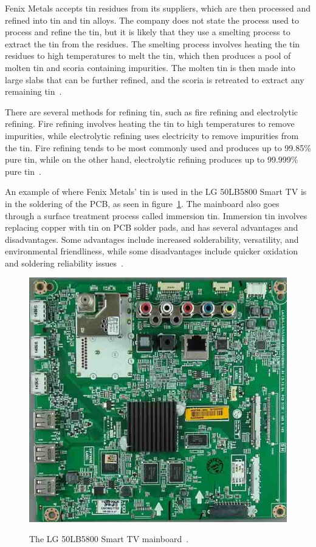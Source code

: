 \documentclass[12pt, letterpaper]{article}
\begin{document}
Fenix Metals accepts tin residues from its suppliers, which are then
processed and refined into tin and tin alloys. The company does not
state the process used to process and refine the tin, but it is likely that they
use a smelting process to extract the tin from the residues. The
smelting process involves heating the tin residues to high temperatures
to melt the tin, which then produces a pool of molten tin and scoria
containing impurities. The molten tin is then made into large slabs that can be
further refined, and the scoria is retreated to extract any remaining
tin~\autocite{barry-1999}.

There are several methods for refining tin, such as fire refining and
electrolytic refining. Fire refining involves heating the tin to high
temperatures to remove impurities, while electrolytic refining uses
electricity to remove impurities from the tin. Fire refining tends to be
most commonly used and produces up to 99.85\% pure tin, while
on the other hand, electrolytic refining produces up to 99.999\% pure
tin~\autocite{barry-1999}.

An example of where Fenix Metals' tin is used in the LG 50LB5800 Smart
TV is in the soldering of the PCB, as seen in
figure~\ref{fig:EBT62999602}. The mainboard also goes through a
surface treatment process called immersion tin. Immersion tin involves
replacing copper with tin on
PCB solder pads, and has several advantages and disadvantages. Some
advantages include increased solderability, versatility, and
environmental friendliness, while some disadvantages include quicker
oxidation and soldering reliability issues~\autocite{jenell-2023}.

\begin{figure}[H]
\medskip
\centering
\includegraphics[width=1\linewidth]{EBT62999602}
\caption{The LG 50LB5800 Smart TV mainboard~\autocite{tv-parts-canada-2024}.}
\medskip\label{fig:EBT62999602}
\end{figure}
\end{document}
